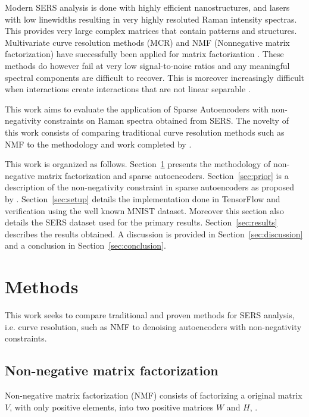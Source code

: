 \documentclass{article}
\begin{document}
Modern SERS analysis is done with highly efficient nanostructures, and lasers with low linewidths resulting in very highly resoluted Raman intensity spectras. This provides very large complex matrices that contain patterns and structures. Multivariate curve resolution methods (MCR) and NMF (Nonnegative matrix factorization) have successfully been applied for matrix factorization \cite{Sajda}. These methods do however fail at very low signal-to-noise ratios and any meaningful spectral components are difficult to recover. This is moreover increasingly difficult when interactions create interactions that are not linear separable \cite{Alstrom2017}.

This work aims to evaluate the application of Sparse Autoencoders with non-negativity constraints on Raman spectra obtained from SERS. The novelty of this work consists of comparing traditional curve resolution methods such as NMF to the methodology and work completed by \cite{Hosseini-Asl2016}.

This work is organized as follows. Section~\ref{sec:methods} presents the methodology of non-negative matrix factorization and sparse autoencoders. Section~\ref{sec:prior} is a description of the non-negativity constraint in sparse autoencoders as proposed by \cite{Hosseini-Asl2016}. Section~\ref{sec:setup} details the implementation done in TensorFlow and verification using the well known MNIST dataset. Moreover this section also details the SERS dataset used for the primary results. Section~\ref{sec:results} describes the results obtained. A discussion is provided in Section~\ref{sec:discussion} and a conclusion in Section~\ref{sec:conclusion}.


\section{Methods}
\label{sec:methods}

This work seeks to compare traditional and proven methods for SERS analysis, i.e. curve resolution, such as NMF to denoising autoencoders with non-negativity constraints. 

\subsection{Non-negative matrix factorization}

Non-negative matrix factorization (NMF) consists of factorizing a original matrix $V$, with only positive elements, into two positive matrices $W$ and $H$, \cite{Seung1999}.
\end{document}
